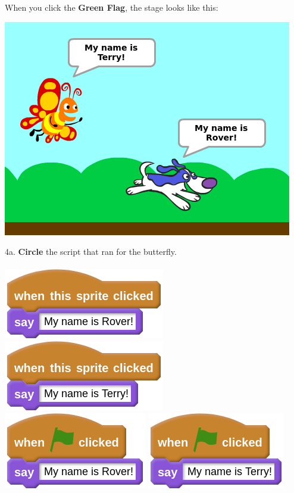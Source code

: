 \documentclass[letterpaper,12pt]{article}
\begin{document}
\newpage
\noindent When you click the \textbf{Green Flag}, the stage looks like this:
\begin{center}
\includegraphics[scale=.5]{q4_stage.png}
\end{center}

\noindent 4a. \textbf{Circle} the script that ran for the butterfly. \\ \\
\includegraphics[scale=.7,valign=t]{q4_script0.png} \hspace{1cm}
\includegraphics[scale=.7,valign=t]{q4_script1.png} \hspace{1cm}
\includegraphics[scale=.7,valign=t]{q4_script2.png} \hspace{1cm}
\includegraphics[scale=.7,valign=t]{q4_script3.png} \hspace{1cm}
\vspace{1cm}
\end{document}
